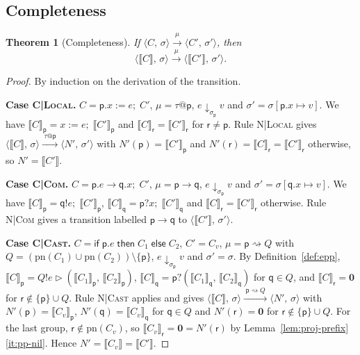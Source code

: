 \documentclass[11pt]{article}
\makeatletter
\theoremstyle{plain}
\newtheorem{theorem}{Theorem}[section]
\theoremstyle{definition}
\theoremstyle{remark}
\newcommand{\kw}[1]{\mathsf{#1}}
\newcommand{\kif}{\kw{if}\;}
\newcommand{\kthen}{\;\kw{then}\;}
\newcommand{\kelse}{\;\kw{else}\;}
\newcommand{\nil}{\mathbf{0}}
\newcommand{\seq}{;\;}
\newcommand{\pp}{\mathsf{p}}
\newcommand{\qq}{\mathsf{q}}
\newcommand{\rr}{\mathsf{r}}
\newcommand{\pn}{\mathrm{pn}}
\newcommand{\eval}[3]{#1 \downarrow_{#2} #3}
\newcommand{\conf}[2]{\langle #1,\, #2\rangle}
\newcommand{\lto}[1]{\xrightarrow{\;#1\;}}
\newcommand{\proj}[2]{\llbracket #1 \rrbracket_{#2}}
\newcommand{\projn}[1]{\llbracket #1 \rrbracket}
\newcommand{\tauat}[1]{\tau\mathord{@}#1}
\newcommand{\cast}[2]{#1 \rightsquigarrow #2}
\newcommand{\upd}[3]{#1[#2 \mapsto #3]}
\newcommand{\rn}[1]{{\normalfont\scshape #1}}
\newcommand{\ifcond}[3]{\kif #1 \kthen #2 \kelse #3}
\newcommand{\sendbr}[4]{#1!#2 \mathbin{\triangleright} (#3,\, #4)}
\newcommand{\recvbr}[3]{#1?(#2,\, #3)}
\newcommand{\case}[1]{\medskip\noindent\textbf{Case #1.}\;}
\makeatother
\begin{document}
\subsection{Completeness}

\begin{theorem}[Completeness]\label{thm:completeness}
  If $\conf{C}{\sigma}\lto{\mu}\conf{C'}{\sigma'}$, then
  \[
    \conf{\projn{C}}{\sigma}\lto{\mu}\conf{\projn{C'}}{\sigma'}.
  \]
\end{theorem}
\begin{proof}
  By induction on the derivation of the transition.

  \case{\rn{C|Local}}
  $C = \pp.x := e\seq C'$, $\mu = \tauat\pp$, $\eval{e}{\sigma_\pp}{v}$ and
  $\sigma' = \upd{\sigma}{\pp.x}{v}$.  We have $\proj{C}{\pp} = x := e\seq\proj{C'}{\pp}$
  and $\proj{C}{\rr} = \proj{C'}{\rr}$ for $\rr\neq\pp$.  Rule \rn{N|Local}
  gives $\conf{\projn{C}}{\sigma}\lto{\tauat\pp}\conf{N'}{\sigma'}$ with
  $N'(\pp) = \proj{C'}{\pp}$ and $N'(\rr) = \proj{C}{\rr} = \proj{C'}{\rr}$
  otherwise, so $N' = \projn{C'}$.

  \case{\rn{C|Com}}
  $C = \pp.e\to\qq.x\seq C'$, $\mu = \pp\to\qq$, $\eval{e}{\sigma_\pp}{v}$ and
  $\sigma' = \upd{\sigma}{\qq.x}{v}$.  We have
  $\proj{C}{\pp} = \qq!e\seq\proj{C'}{\pp}$, $\proj{C}{\qq} = \pp?x\seq\proj{C'}{\qq}$
  and $\proj{C}{\rr} = \proj{C'}{\rr}$ otherwise.  Rule \rn{N|Com} gives a
  transition labelled $\pp\to\qq$ to $\conf{\projn{C'}}{\sigma'}$.

  \case{\rn{C|Cast}}
  $C = \ifcond{\pp.e}{C_1}{C_2}$, $C' = C_v$, $\mu = \cast{\pp}{Q}$ with
  $Q = (\pn(C_1)\cup\pn(C_2))\setminus\{\pp\}$, $\eval{e}{\sigma_\pp}{v}$ and
  $\sigma' = \sigma$.  By Definition~\ref{def:epp},
  $\proj{C}{\pp} = \sendbr{Q}{e}{\proj{C_1}{\pp}}{\proj{C_2}{\pp}}$,
  $\proj{C}{\qq} = \recvbr{\pp}{\proj{C_1}{\qq}}{\proj{C_2}{\qq}}$ for $\qq\in Q$,
  and $\proj{C}{\rr} = \nil$ for $\rr\notin\{\pp\}\cup Q$.  Rule \rn{N|Cast}
  applies and gives $\conf{\projn{C}}{\sigma}\lto{\cast{\pp}{Q}}\conf{N'}{\sigma}$
  with $N'(\pp) = \proj{C_v}{\pp}$, $N'(\qq) = \proj{C_v}{\qq}$ for $\qq\in Q$
  and $N'(\rr) = \nil$ for $\rr\notin\{\pp\}\cup Q$.  For the last group,
  $\rr\notin\pn(C_v)$, so $\proj{C_v}{\rr} = \nil = N'(\rr)$ by
  Lemma~\ref{lem:proj-prefix}\ref{it:pp-nil}.  Hence $N' = \projn{C_v} = \projn{C'}$.


\end{proof}
\end{document}
